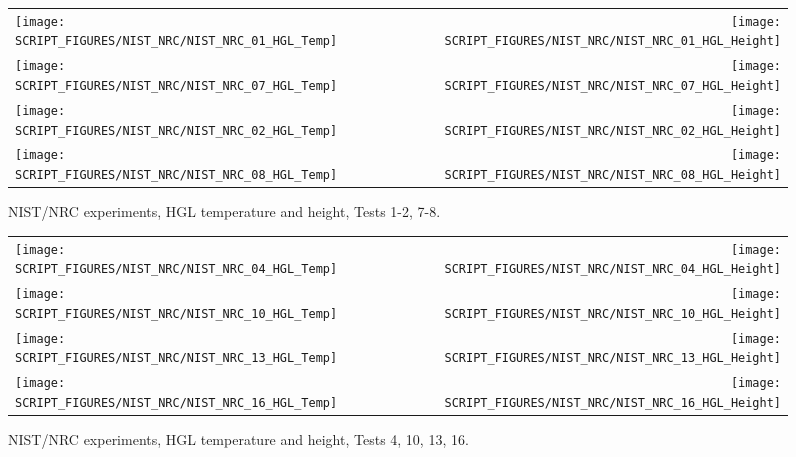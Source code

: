 \begin{figure}[p]
\begin{tabular*}{\textwidth}{l@{\extracolsep{\fill}}r}
\texttt{[image: SCRIPT\_FIGURES/NIST\_NRC/NIST\_NRC\_01\_HGL\_Temp]} &
\texttt{[image: SCRIPT\_FIGURES/NIST\_NRC/NIST\_NRC\_01\_HGL\_Height]} \\
\texttt{[image: SCRIPT\_FIGURES/NIST\_NRC/NIST\_NRC\_07\_HGL\_Temp]} &
\texttt{[image: SCRIPT\_FIGURES/NIST\_NRC/NIST\_NRC\_07\_HGL\_Height]} \\
\texttt{[image: SCRIPT\_FIGURES/NIST\_NRC/NIST\_NRC\_02\_HGL\_Temp]} &
\texttt{[image: SCRIPT\_FIGURES/NIST\_NRC/NIST\_NRC\_02\_HGL\_Height]} \\
\texttt{[image: SCRIPT\_FIGURES/NIST\_NRC/NIST\_NRC\_08\_HGL\_Temp]} &
\texttt{[image: SCRIPT\_FIGURES/NIST\_NRC/NIST\_NRC\_08\_HGL\_Height]}
\end{tabular*}
\caption[NIST/NRC experiments, HGL temperature and height, Tests 1-2, 7-8]
{NIST/NRC experiments, HGL temperature and height, Tests 1-2, 7-8.}
\label{NIST_NRC_HGL_1}
\end{figure}

\begin{figure}[p]
\begin{tabular*}{\textwidth}{l@{\extracolsep{\fill}}r}
\texttt{[image: SCRIPT\_FIGURES/NIST\_NRC/NIST\_NRC\_04\_HGL\_Temp]} &
\texttt{[image: SCRIPT\_FIGURES/NIST\_NRC/NIST\_NRC\_04\_HGL\_Height]} \\
\texttt{[image: SCRIPT\_FIGURES/NIST\_NRC/NIST\_NRC\_10\_HGL\_Temp]} &
\texttt{[image: SCRIPT\_FIGURES/NIST\_NRC/NIST\_NRC\_10\_HGL\_Height]} \\
\texttt{[image: SCRIPT\_FIGURES/NIST\_NRC/NIST\_NRC\_13\_HGL\_Temp]} &
\texttt{[image: SCRIPT\_FIGURES/NIST\_NRC/NIST\_NRC\_13\_HGL\_Height]} \\
\texttt{[image: SCRIPT\_FIGURES/NIST\_NRC/NIST\_NRC\_16\_HGL\_Temp]} &
\texttt{[image: SCRIPT\_FIGURES/NIST\_NRC/NIST\_NRC\_16\_HGL\_Height]}
\end{tabular*}
\caption[NIST/NRC experiments, HGL temperature and height, Tests 4, 10, 13, 16]
{NIST/NRC experiments, HGL temperature and height, Tests 4, 10, 13, 16.}
\label{NIST_NRC_HGL_2}
\end{figure}

